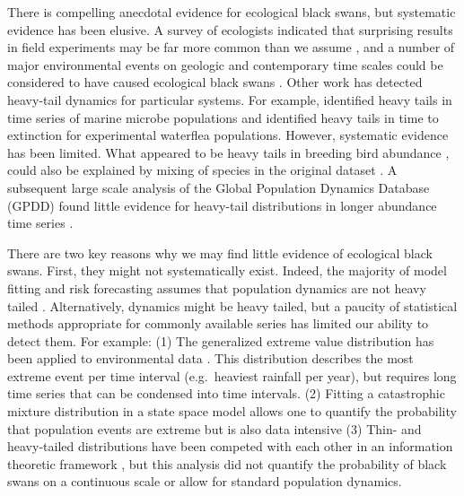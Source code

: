 There is compelling anecdotal evidence for ecological black swans, but
systematic evidence has been elusive. A survey of ecologists indicated that
surprising results in field experiments may be far more common than we assume
\citep{doak2008}, and a number of major environmental events on geologic and
contemporary time scales could be considered to have caused ecological black
swans \citep{nunez2012}. Other work has detected heavy-tail dynamics for
particular systems. For example, \citet{segura2013} identified heavy tails in
time series of marine microbe populations and \citet{drake2014} identified
heavy tails in time to extinction for experimental waterflea populations.
However, systematic evidence has been limited. What appeared to be heavy tails
in breeding bird abundance \citep{keitt1998}, could also be explained by mixing
of species in the original dataset \citep{allen2001}. A subsequent large scale
analysis of the Global Population Dynamics Database (GPDD) found little
evidence for heavy-tail distributions in longer abundance time series
\citet{halley2002}.

There are two key reasons why we may find little evidence of ecological black
swans. First, they might not systematically exist. Indeed, the majority of
model fitting and risk forecasting assumes that population dynamics are not
heavy tailed \citep[e.g.][]{brook2006a,dennis2006,knape2012}. Alternatively,
dynamics might be heavy tailed, but a paucity of statistical methods
appropriate for commonly available series has limited our ability to detect
them. For example: (1) The generalized extreme value distribution has been
applied to environmental data \citep[e.g.][]{katz2005}. This distribution
describes the most extreme event per time interval (e.g.~heaviest rainfall per
year), but requires long time series that can be condensed into time intervals.
(2) Fitting a catastrophic mixture distribution in a state space model allows
one to quantify the probability that population events are extreme but is also
data intensive \citep{ward2007} (3) Thin- and heavy-tailed distributions have
been competed with each other in an information theoretic framework
\citep{halley2002}, but this analysis did not quantify the probability of black
swans on a continuous scale or allow for standard population dynamics.

